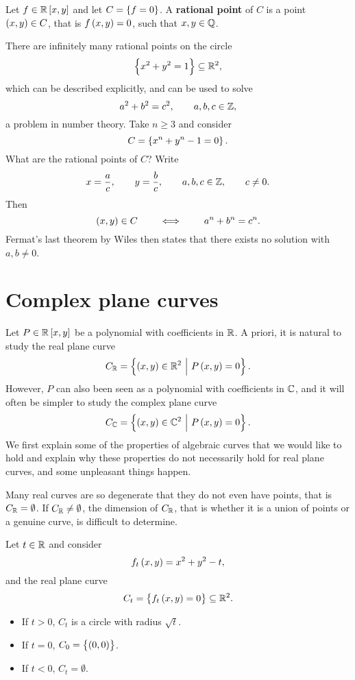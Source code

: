 
\begin{definition}
Let $ f \in \RR\sbr{x, y} $ and let $ C = \cbr{f = 0} $. A \textbf{rational point} of $ C $ is a point $ \br{x, y} \in C $, that is $ f\br{x, y} = 0 $, such that $ x, y \in \mathbb{Q} $.
\end{definition}

\begin{example}
There are infinitely many rational points on the circle
$$ \cbr{x^2 + y^2 = 1} \subseteq \RR^2, $$
which can be described explicitly, and can be used to solve
$$ a^2 + b^2 = c^2, \qquad a, b, c \in \mathbb{Z}, $$
a problem in number theory. Take $ n \ge 3 $ and consider
$$ C = \cbr{x^n + y^n - 1 = 0}. $$
What are the rational points of $ C $? Write
$$ x = \dfrac{a}{c}, \qquad y = \dfrac{b}{c}, \qquad a, b, c \in \mathbb{Z}, \qquad c \ne 0. $$
Then
$$ \br{x, y} \in C \qquad \iff \qquad a^n + b^n = c^n. $$
Fermat's last theorem by Wiles then states that there exists no solution with $ a, b \ne 0 $.
\end{example}

\pagebreak

\section{Complex plane curves}

Let $ P \in \RR\sbr{x, y} $ be a polynomial with coefficients in $ \mathbb{R} $. A priori, it is natural to study the real plane curve
$$ C_\RR = \cbr{\br{x, y} \in \RR^2 \st P\br{x, y} = 0}. $$
However, $ P $ can also been seen as a polynomial with coefficients in $ \mathbb{C} $, and it will often be simpler to study the complex plane curve
$$ C_\CC = \cbr{\br{x, y} \in \CC^2 \st P\br{x, y} = 0}. $$
We first explain some of the properties of algebraic curves that we would like to hold and explain why these properties do not necessarily hold for real plane curves, and some unpleasant things happen.

\begin{fact**}
Many real curves are so degenerate that they do not even have points, that is $ C_{\mathbb{R}} = \emptyset $. If $ C_{\mathbb{R}} \ne \emptyset $, the dimension of $ C_{\mathbb{R}} $, that is whether it is a union of points or a genuine curve, is difficult to determine.
\end{fact**}

\begin{example}
\label{eg:2.1}
Let $ t \in \mathbb{R} $ and consider
$$ f_t\br{x, y} = x^2 + y^2 - t, $$
and the real plane curve
$$ C_t = \cbr{f_t\br{x, y} = 0} \subseteq \RR^2. $$
\begin{itemize}
\item If $ t > 0 $, $ C_t $ is a circle with radius $ \sqrt{t} $.
\item If $ t = 0 $, $ C_0 = \cbr{\br{0, 0}} $.
\item If $ t < 0 $, $ C_t = \emptyset $.
\end{itemize}

\end{example}

